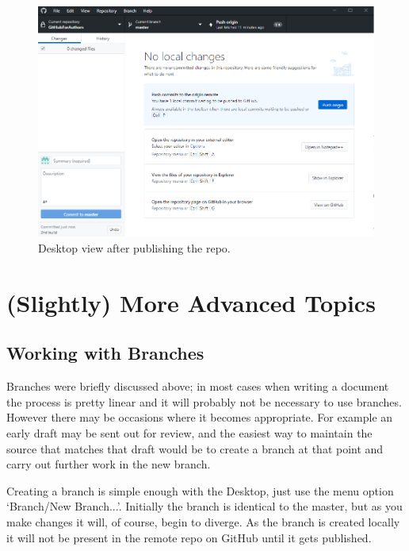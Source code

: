 \documentclass[a4paper, 12pt]{article}
\begin{document}
\begin{figure}
\centering
\includegraphics[width=\linewidth]{FirstPush}
\caption{Desktop view after publishing the repo.}
\label{firstpush}
\end{figure}

\section{(Slightly) More Advanced Topics}
\subsection{Working with Branches}
Branches were briefly discussed above; in most cases when writing a document the process is pretty linear and it will probably not be necessary to use branches. However there may be occasions where it becomes appropriate. For example an early draft may be sent out for review, and the easiest way to maintain the source that matches that draft would be to create a branch at that point and carry out further work in the new branch.

Creating a branch is simple enough with the Desktop, just use the menu option `Branch/New Branch...'. Initially the branch is identical to the master, but as you make changes it will, of course, begin to diverge. As the branch is created locally it will not be present in the remote repo on GitHub until it gets published.
\end{document}

